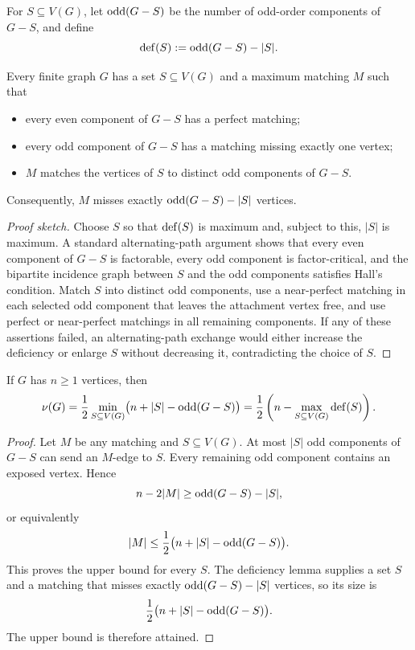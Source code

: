 \begin{notedefinition}
For $S\subseteq V(G)$, let $\operatorname{odd}(G-S)$ be the number of odd-order components
of $G-S$, and define
\[
  \operatorname{def}(S):=\operatorname{odd}(G-S)-|S|.
\]
\end{notedefinition}

\begin{notelemma}
Every finite graph $G$ has a set $S\subseteq V(G)$ and a maximum matching $M$
such that
\begin{itemize}
  \item every even component of $G-S$ has a perfect matching;
  \item every odd component of $G-S$ has a matching missing exactly one
        vertex;
  \item $M$ matches the vertices of $S$ to distinct odd components of
        $G-S$.
\end{itemize}
Consequently, $M$ misses exactly $\operatorname{odd}(G-S)-|S|$ vertices.
\end{notelemma}
\begin{proof}[Proof sketch]
Choose $S$ so that $\operatorname{def}(S)$ is maximum and, subject to this, $|S|$ is
maximum.  A standard alternating-path argument shows that every even
component of $G-S$ is factorable, every odd component is factor-critical, and
the bipartite incidence graph between $S$ and the odd components satisfies
Hall's condition.  Match $S$ into distinct odd components, use a near-perfect
matching in each selected odd component that leaves the attachment vertex
free, and use perfect or near-perfect matchings in all remaining components.
If any of these assertions failed, an alternating-path exchange would either
increase the deficiency or enlarge $S$ without decreasing it, contradicting
the choice of $S$.
\end{proof}

\begin{notetheorem}
If $G$ has $n\ge1$ vertices, then
\[
  \nu(G)
  =\frac12\min_{S\subseteq V(G)}
    \bigl(n+|S|-\operatorname{odd}(G-S)\bigr)
  =\frac12\left(n-
    \max_{S\subseteq V(G)}\operatorname{def}(S)\right).
\]
\end{notetheorem}
\begin{proof}
Let $M$ be any matching and $S\subseteq V(G)$.  At most $|S|$ odd components
of $G-S$ can send an $M$-edge to $S$.  Every remaining odd component contains
an exposed vertex.  Hence
\[
  n-2|M|\ge \operatorname{odd}(G-S)-|S|,
\]
or equivalently
\[
  |M|\le\frac12\bigl(n+|S|-\operatorname{odd}(G-S)\bigr).
\]
This proves the upper bound for every $S$.  The deficiency lemma supplies a
set $S$ and a matching that misses exactly $\operatorname{odd}(G-S)-|S|$ vertices, so
its size is
\[
  \frac12\bigl(n+|S|-\operatorname{odd}(G-S)\bigr).
\]
The upper bound is therefore attained.
\end{proof}

